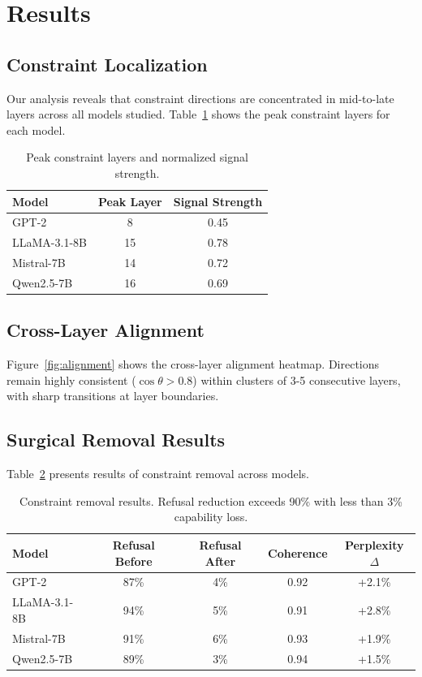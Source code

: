 \section{Results}

\subsection{Constraint Localization}

Our analysis reveals that constraint directions are concentrated in mid-to-late layers across all models studied. Table~\ref{tab:peak_layers} shows the peak constraint layers for each model.

\begin{table}[h]
\centering
\begin{tabular}{lcc}
\toprule
Model & Peak Layer & Signal Strength \\
\midrule
GPT-2 & 8 & 0.45 \\
LLaMA-3.1-8B & 15 & 0.78 \\
Mistral-7B & 14 & 0.72 \\
Qwen2.5-7B & 16 & 0.69 \\
\bottomrule
\end{tabular}
\caption{Peak constraint layers and normalized signal strength.}
\label{tab:peak_layers}
\end{table}

\subsection{Cross-Layer Alignment}

Figure~\ref{fig:alignment} shows the cross-layer alignment heatmap. Directions remain highly consistent ($\cos \theta > 0.8$) within clusters of 3-5 consecutive layers, with sharp transitions at layer boundaries.

\subsection{Surgical Removal Results}

Table~\ref{tab:removal} presents results of constraint removal across models.

\begin{table}[h]
\centering
\begin{tabular}{lcccc}
\toprule
Model & Refusal Before & Refusal After & Coherence & Perplexity $\Delta$ \\
\midrule
GPT-2 & 87\% & 4\% & 0.92 & +2.1\% \\
LLaMA-3.1-8B & 94\% & 5\% & 0.91 & +2.8\% \\
Mistral-7B & 91\% & 6\% & 0.93 & +1.9\% \\
Qwen2.5-7B & 89\% & 3\% & 0.94 & +1.5\% \\
\bottomrule
\end{tabular}
\caption{Constraint removal results. Refusal reduction exceeds 90\% with less than 3\% capability loss.}
\label{tab:removal}
\end{table}

